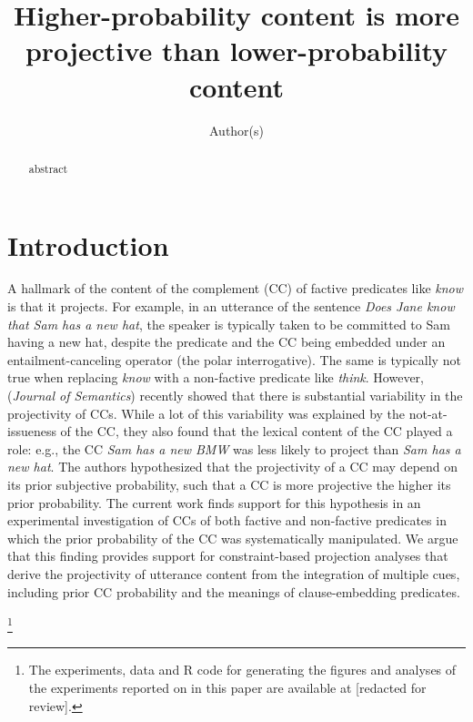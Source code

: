 \documentclass[11pt,fleqn]{article}
\title{Higher-probability content is more projective than lower-probability content}
\author{Author(s)}
\newcommand{\6}{\mbox{$[\hspace*{-.6mm}[$}}
\newcommand{\9}{\mbox{$]\hspace*{-.6mm}]$}}
\begin{document}

\maketitle

\vspace*{-1cm}

\begin{abstract}

abstract

\end{abstract}

			
\section{Introduction}\label{s1}

A hallmark of the content of the complement (CC) of factive predicates like {\em know}  is that it projects. For example, in an utterance of the sentence \emph{Does Jane know that Sam has a new hat}, the speaker is typically taken to be committed to Sam having a new hat, despite the predicate and the CC being embedded under an entailment-canceling operator (the polar interrogative). The same is typically not true when replacing \emph{know} with a non-factive predicate like \emph{think}. However,  \citealt*{tbd-variability} ({\em Journal of Semantics}) recently showed that there is substantial variability in the projectivity of CCs. While a lot of this variability was explained by the not-at-issueness of the CC, they also found that the lexical content of the CC played a role: e.g., the CC \emph{Sam has a new BMW} was less likely to project than \emph{Sam has a new hat}. The authors hypothesized that the projectivity of a CC may depend on its prior subjective probability, such that a CC is more projective the higher its prior probability. The current work finds support for this hypothesis in an experimental investigation of CCs of both factive and non-factive predicates in which the prior probability of the CC was systematically manipulated. We argue that this finding provides support for constraint-based projection analyses that derive the projectivity of utterance content from the integration of multiple cues, including prior CC probability and the meanings of clause-embedding predicates.

\footnote{\label{f-github}The experiments, data and R code for generating the figures and analyses of the experiments reported on in this paper are available at [redacted for review].}
\end{document}
